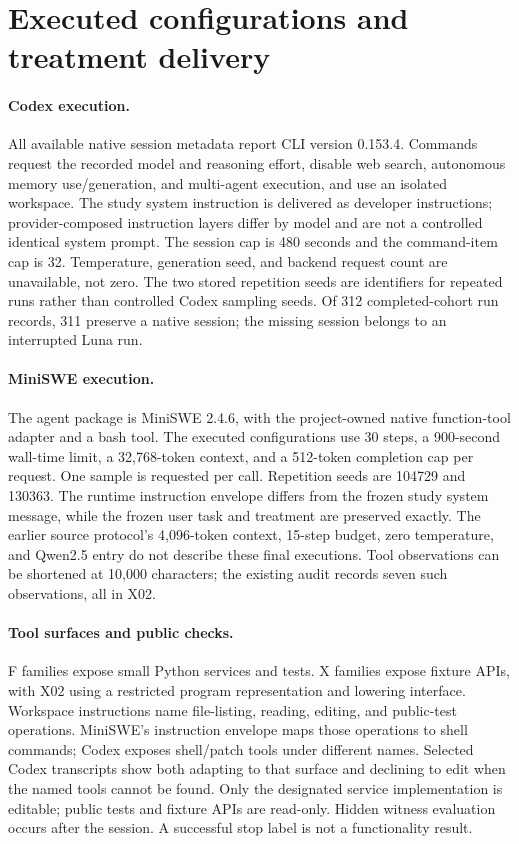 \section{Executed configurations and treatment delivery}
\label{app:config}


\paragraph{Codex execution.}
All available native session metadata report CLI version 0.153.4. Commands request the recorded model and reasoning effort, disable web search, autonomous memory use/generation, and multi-agent execution, and use an isolated workspace. The study system instruction is delivered as developer instructions; provider-composed instruction layers differ by model and are not a controlled identical system prompt. The session cap is 480 seconds and the command-item cap is 32. Temperature, generation seed, and backend request count are unavailable, not zero. The two stored repetition seeds are identifiers for repeated runs rather than controlled Codex sampling seeds. Of 312 completed-cohort run records, 311 preserve a native session; the missing session belongs to an interrupted Luna run.

\paragraph{MiniSWE execution.}
The agent package is MiniSWE 2.4.6, with the project-owned native function-tool adapter and a bash tool. The executed configurations use 30 steps, a 900-second wall-time limit, a 32,768-token context, and a 512-token completion cap per request. One sample is requested per call. Repetition seeds are 104729 and 130363. The runtime instruction envelope differs from the frozen study system message, while the frozen user task and treatment are preserved exactly. The earlier source protocol's 4,096-token context, 15-step budget, zero temperature, and Qwen2.5 entry do not describe these final executions. Tool observations can be shortened at 10,000 characters; the existing audit records seven such observations, all in X02.

\paragraph{Tool surfaces and public checks.}
F families expose small Python services and tests. X families expose fixture APIs, with X02 using a restricted program representation and lowering interface. Workspace instructions name file-listing, reading, editing, and public-test operations. MiniSWE's instruction envelope maps those operations to shell commands; Codex exposes shell/patch tools under different names. Selected Codex transcripts show both adapting to that surface and declining to edit when the named tools cannot be found. Only the designated service implementation is editable; public tests and fixture APIs are read-only. Hidden witness evaluation occurs after the session. A successful stop label is not a functionality result.

